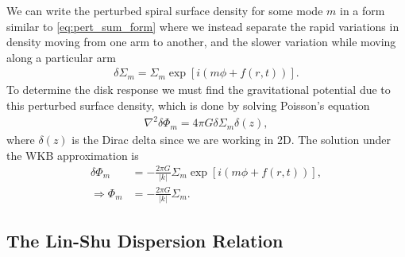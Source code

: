 We can write the perturbed spiral surface density for some mode $m$ in a form similar to \ref{eq:pert_sum_form} where we instead separate the rapid variations in density moving from one arm to another, and the slower variation while moving along a particular arm
\begin{align}
    \delta \Sigma_m = \Sigma_m \exp \left[ i \left( m \phi + f(r,t)  \right)  \right]. \label{eq:sigma_WKB}
\end{align}
To determine the disk response we must find the gravitational potential due to this perturbed surface density, which is done by solving Poisson's equation
\begin{align}
    \nabla^2 \delta \Phi_m = 4 \pi G \delta \Sigma_m \delta(z), \label{eq:poisson_pert}
\end{align}
where $\delta(z)$ is the Dirac delta since we are working in 2D. 
The solution under the WKB approximation is \citep[e.g.][]{binney2008}
\begin{align}
    \delta \Phi_m &= - \frac{2 \pi G}{|k|} \Sigma_m \exp \left[ i \left( m \phi + f(r,t)  \right)  \right], \\
    \Rightarrow \Phi_m &= - \frac{2 \pi G}{|k|} \Sigma_m. \label{eq:phi_m_sigma_m}
\end{align}

\subsection{The Lin-Shu Dispersion Relation} \label{sec:linshu}

